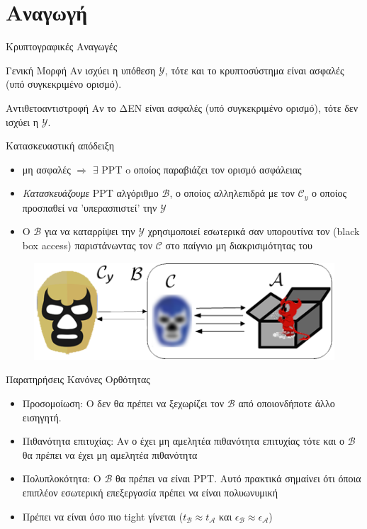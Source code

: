 \documentclass[handout]{beamer}
\begin{document}
\section{Αναγωγή}
\begin{frame}[allowframebreaks]{Κρυπτογραφικές Αναγωγές}
\begin{block}{Γενική Μορφή}
Αν ισχύει η υπόθεση $\mathcal{Y}$, τότε και το κρυπτοσύστημα \cs είναι ασφαλές (υπό συγκεκριμένο ορισμό).
\end{block}
\medskip

\begin{block}{Αντιθετοαντιστροφή}
Αν το \cs ΔΕΝ είναι ασφαλές (υπό συγκεκριμένο ορισμό), τότε δεν ισχύει η $\mathcal{Y}$.
\end{block}

Κατασκευαστική απόδειξη

\framebreak

\begin{itemize}
\item \cs μη ασφαλές $\Rightarrow$ $\exists$ PPT \adv  o οποίος παραβιάζει τον ορισμό ασφάλειας
\item \emph{Κατασκευάζουμε} PPT αλγόριθμο  $\mathcal{B}$, ο οποίος αλληλεπιδρά με τον $\mathcal{C}_y$ ο οποίος προσπαθεί να 'υπερασπιστεί' την $\mathcal{Y}$
\item Ο $\mathcal{B}$ για να καταρρίψει την $\mathcal{Y}$ χρησιμοποιεί εσωτερικά σαν υπορουτίνα τον \adv (black box access) παριστάνωντας τον $\mathcal{C}$ στο παίγνιο μη διακρισιμότητας του \cs
\end{itemize}

\framebreak

\begin{figure}
\includegraphics[scale=0.8]{ProofReduction.png}  
\end{figure}
 
\end{frame}

\begin{frame}{Παρατηρήσεις}
Κανόνες Ορθότητας
\begin{itemize}
	\item Προσομοίωση: Ο \adv δεν θα πρέπει να ξεχωρίζει τον $\mathcal{B}$ από οποιονδήποτε άλλο εισηγητή.
	\item Πιθανότητα επιτυχίας: Αν ο \adv έχει μη αμελητέα πιθανότητα επιτυχίας τότε και ο $\mathcal{B}$ θα πρέπει να έχει μη αμελητέα πιθανότητα
	\item Πολυπλοκότητα: Ο $\mathcal{B}$ θα πρέπει να είναι PPT. Αυτό πρακτικά σημαίνει ότι όποια επιπλέον εσωτερική επεξεργασία  πρέπει να είναι πολυωνυμική  
	\item Πρέπει να είναι όσο πιο tight γίνεται ($t_\mathcal{B} \approx t_\mathcal{A}$ και $\epsilon_\mathcal{B} \approx \epsilon_\mathcal{A}$)
\end{itemize}
\end{frame}
\end{document}
